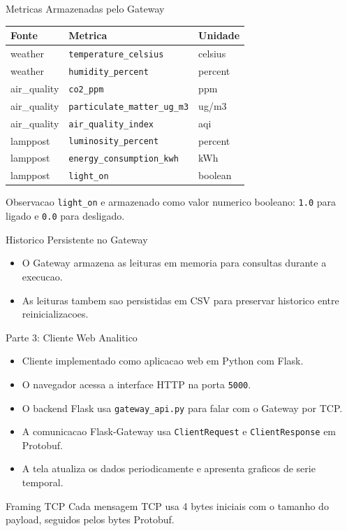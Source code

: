 \documentclass[aspectratio=169]{beamer}
\begin{document}
\begin{frame}{Metricas Armazenadas pelo Gateway}
  \begin{table}
    \centering
    \begin{tabular}{lll}
      \toprule
      Fonte & Metrica & Unidade \\
      \midrule
      weather & \texttt{temperature\_celsius} & celsius \\
      weather & \texttt{humidity\_percent} & percent \\
      air\_quality & \texttt{co2\_ppm} & ppm \\
      air\_quality & \texttt{particulate\_matter\_ug\_m3} & ug/m3 \\
      air\_quality & \texttt{air\_quality\_index} & aqi \\
      lamppost & \texttt{luminosity\_percent} & percent \\
      lamppost & \texttt{energy\_consumption\_kwh} & kWh \\
      lamppost & \texttt{light\_on} & boolean \\
      \bottomrule
    \end{tabular}
  \end{table}
  \begin{block}{Observacao}
    \texttt{light\_on} e armazenado como valor numerico booleano: \texttt{1.0} para ligado e \texttt{0.0} para desligado.
  \end{block}
\end{frame}

\begin{frame}{Historico Persistente no Gateway}
  \begin{itemize}
    \item O Gateway armazena as leituras em memoria para consultas durante a execucao.
    \item As leituras tambem sao persistidas em CSV para preservar historico entre reinicializacoes.
  \end{itemize}
\end{frame}

\begin{frame}{Parte 3: Cliente Web Analitico}
  \begin{itemize}
    \item Cliente implementado como aplicacao web em Python com Flask.
    \item O navegador acessa a interface HTTP na porta \texttt{5000}.
    \item O backend Flask usa \texttt{gateway\_api.py} para falar com o Gateway por TCP.
    \item A comunicacao Flask-Gateway usa \texttt{ClientRequest} e \texttt{ClientResponse} em Protobuf.
    \item A tela atualiza os dados periodicamente e apresenta graficos de serie temporal.
  \end{itemize}

  \begin{block}{Framing TCP}
    Cada mensagem TCP usa 4 bytes iniciais com o tamanho do payload, seguidos pelos bytes Protobuf.
  \end{block}
\end{frame}
\end{document}
